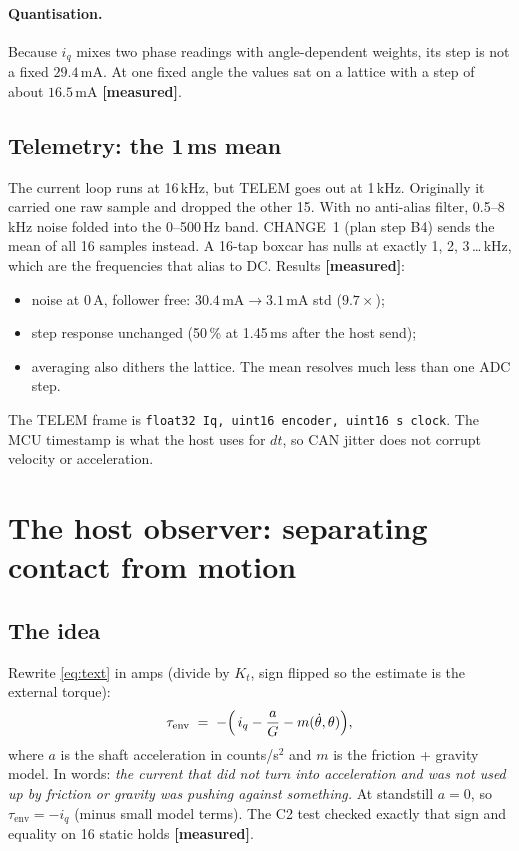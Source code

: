 \documentclass[11pt,a4paper]{article}
\newcommand{\iq}{i_q}
\newcommand{\mA}{\,\mathrm{mA}}
\newcommand{\measured}{\textcolor{teal!70!black}{\textbf{[measured]}}}
\begin{document}
\paragraph{Quantisation.} Because $\iq$ mixes two phase readings with
angle-dependent weights, its step is not a fixed $29.4\mA$. At one fixed
angle the values sat on a lattice with a step of about $16.5\mA$
\measured.

\subsection{Telemetry: the 1\,ms mean}

The current loop runs at 16\,kHz, but TELEM goes out at 1\,kHz. Originally
it carried one raw sample and dropped the other 15. With no anti-alias
filter, 0.5--8\,kHz noise folded into the 0--500\,Hz band. CHANGE~1 (plan
step B4) sends the mean of all 16 samples instead. A 16-tap boxcar has
nulls at exactly 1, 2, 3\,\ldots\,kHz, which are the frequencies that
alias to DC. Results \measured:
\begin{itemize}
  \item noise at 0\,A, follower free: $30.4\mA \to 3.1\mA$ std ($9.7\times$);
  \item step response unchanged (50\,\% at 1.45\,ms after the host send);
  \item averaging also dithers the lattice. The mean resolves much less
        than one ADC step.
\end{itemize}
The TELEM frame is \texttt{float32 Iq, uint16 encoder, uint16 \textmu s
clock}. The MCU timestamp is what the host uses for $dt$, so CAN jitter
does not corrupt velocity or acceleration.

\section{The host observer: separating contact from motion}
\label{sec:observer}

\subsection{The idea}

Rewrite \eqref{eq:text} in amps (divide by $K_t$, sign flipped so the
estimate is the external torque):
\begin{equation}
  \tau_{\mathrm{env}} \;=\; -\Bigl(\,\iq - \frac{a}{G} - m(\dot\theta,\theta)\Bigr),
\end{equation}
where $a$ is the shaft acceleration in counts/s$^2$ and $m$ is the
friction + gravity model. In words: \emph{the current that did not turn
into acceleration and was not used up by friction or gravity was pushing
against something.} At standstill $a = 0$, so $\tau_{\mathrm{env}} = -\iq$
(minus small model terms). The C2 test checked exactly that sign and
equality on 16 static holds \measured.
\end{document}
